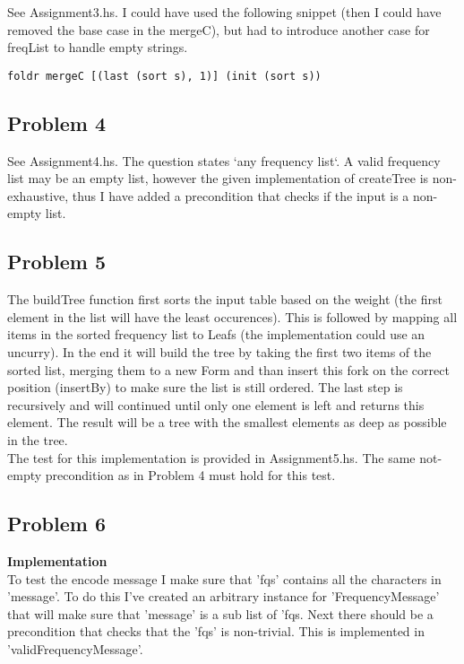 See Assignment3.hs. I could have used the following snippet (then I could have removed the base case in the mergeC), but had to introduce another case for freqList to handle empty strings.

\begin{lstlisting}
foldr mergeC [(last (sort s), 1)] (init (sort s))
\end{lstlisting}


\subsection*{Problem 4}

See Assignment4.hs. The question states `any frequency list`. A valid frequency list may be an empty list, however the given implementation of createTree is non-exhaustive,
thus I have added a precondition that checks if the input is a non-empty list.

\subsection*{Problem 5}

The buildTree function first sorts the input table based on the weight (the first element in the list will have the least occurences).
This is followed by mapping all items in the sorted frequency list to Leafs (the implementation could use an uncurry).
In the end it will build the tree by taking the first two items of the sorted list, merging them to a new Form and than insert this fork on the correct position (insertBy) to make sure the list is still ordered.
The last step is recursively and will continued until only one element is left and returns this element.
The result will be a tree with the smallest elements as deep as possible in the tree. \\
The test for this implementation is provided in Assignment5.hs. The same not-empty precondition as in Problem 4 must hold for this test.

\subsection*{Problem 6}

\textbf{Implementation} \\
To test the encode message I make sure that 'fqs' contains all the characters in 'message'. To do this I've created an arbitrary instance for 'FrequencyMessage' that will make sure that 'message' is a sub list of 'fqs.
Next there should be a precondition that checks that the 'fqs' is non-trivial. This is implemented in 'validFrequencyMessage'. \\

